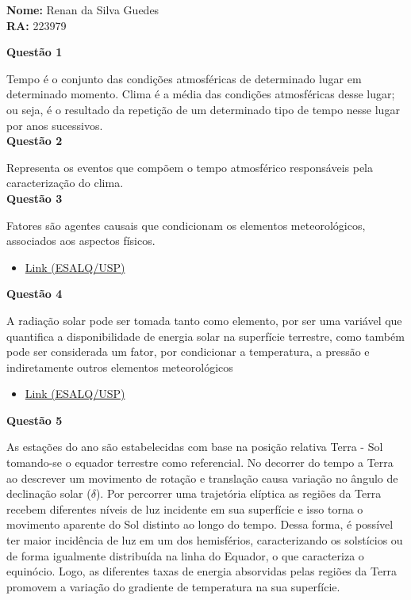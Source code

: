 \documentclass[a4paper, 12pt]{article}
\newcommand{\qs}[1]{\noindent\textbf{Questão #1}}
\begin{document}
	\begin{flushleft}
		\textbf{Nome:} Renan da Silva Guedes\\
		\textbf{RA:} 223979
	\end{flushleft}
		

		\qs{1}
		
		\hspace{.2cm}Tempo é o conjunto das condições atmosféricas de determinado lugar em determinado momento. Clima é a média das condições atmosféricas desse lugar; ou seja, é o resultado da repetição de um determinado tipo de tempo nesse lugar por anos sucessivos.\\
		
		\qs{2}
	
		\hspace{.2cm}Representa os eventos que compõem o tempo atmosférico responsáveis pela caracterização do clima.\\
		
		\qs{3}
			
		\hspace{.2cm}Fatores são agentes causais que
		condicionam os elementos meteorológicos, associados aos aspectos físicos.
		
		\begin{itemize}
			\item\href{http://www.leb.esalq.usp.br/leb/aulas/lce306/Aula2_2012.pdf}{Link (ESALQ/USP)}
		\end{itemize}
		
		\qs{4}
		
		\hspace{.2cm}A radiação solar pode ser tomada
		tanto como elemento, por ser uma variável
		que quantifica a disponibilidade de energia
		solar na superfície terrestre, como também
		pode ser considerada um fator, por
		condicionar a temperatura, a pressão e
		indiretamente outros elementos meteorológicos
		
		\begin{itemize}
			\item\href{http://www.leb.esalq.usp.br/leb/aulas/lce306/Aula2_2012.pdf}{Link (ESALQ/USP)}
		\end{itemize}
		
		\qs{5}
		
		\hspace{.2cm}As estações do ano são estabelecidas com base na posição relativa Terra - Sol tomando-se o equador terrestre como referencial. No decorrer do tempo a Terra ao descrever um movimento de rotação e translação causa variação no ângulo de declinação solar ($\delta$). Por percorrer uma trajetória elíptica as regiões da Terra recebem diferentes níveis de luz incidente em sua superfície e isso torna o movimento aparente do Sol distinto ao longo do tempo. Dessa forma, é possível ter maior incidência de luz em um dos hemisférios, caracterizando os solstícios ou de forma igualmente distribuída na linha do Equador, o que caracteriza o equinócio. Logo, as diferentes taxas de energia absorvidas pelas regiões da Terra promovem a variação do gradiente de temperatura na sua superfície.
		
\end{document}

